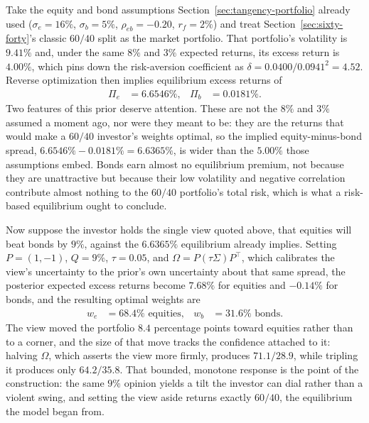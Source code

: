 \documentclass[../ai_in_finance]{subfiles}
\begin{document}
\label{sec:bl-example}

Take the equity and bond assumptions Section~\ref{sec:tangency-portfolio} already used ($\sigma_e=16\%$, $\sigma_b=5\%$, $\rho_{eb}=-0.20$, $r_f=2\%$) and treat Section~\ref{sec:sixty-forty}'s classic $60/40$ split as the market portfolio. That portfolio's volatility is $9.41\%$ and, under the same $8\%$ and $3\%$ expected returns, its excess return is $4.00\%$, which pins down the risk-aversion coefficient as $\delta = 0.0400/0.0941^2 = 4.52$. Reverse optimization then implies equilibrium excess returns of
\begin{align*}
\Pi_e &= 6.6546\%, & \Pi_b &= 0.0181\%.
\end{align*}
Two features of this prior deserve attention. These are not the $8\%$ and $3\%$ assumed a moment ago, nor were they meant to be: they are the returns that would make a $60/40$ investor's weights optimal, so the implied equity-minus-bond spread, $6.6546\% - 0.0181\% = 6.6365\%$, is wider than the $5.00\%$ those assumptions embed. Bonds earn almost no equilibrium premium, not because they are unattractive but because their low volatility and negative correlation contribute almost nothing to the $60/40$ portfolio's total risk, which is what a risk-based equilibrium ought to conclude.

Now suppose the investor holds the single view quoted above, that equities will beat bonds by $9\%$, against the $6.6365\%$ equilibrium already implies. Setting $P = (1, -1)$, $Q = 9\%$, $\tau = 0.05$, and $\Omega = P(\tau\Sigma)P^\top$, which calibrates the view's uncertainty to the prior's own uncertainty about that same spread, the posterior expected excess returns become $7.68\%$ for equities and $-0.14\%$ for bonds, and the resulting optimal weights are
\begin{align*}
w_e &= 68.4\% \text{ equities}, & w_b &= 31.6\% \text{ bonds}.
\end{align*}
The view moved the portfolio $8.4$ percentage points toward equities rather than to a corner, and the size of that move tracks the confidence attached to it: halving $\Omega$, which asserts the view more firmly, produces $71.1/28.9$, while tripling it produces only $64.2/35.8$. That bounded, monotone response is the point of the construction: the same $9\%$ opinion yields a tilt the investor can dial rather than a violent swing, and setting the view aside returns exactly $60/40$, the equilibrium the model began from.
\end{document}

